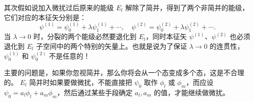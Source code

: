 其次假如说加入微扰过后原来的能级 $E_{l}$ 解除了简并，得到了两个非简并的能级，它们对应的本征矢分别是：
\begin{equation}
	\psi^{(1)}=\psi_{0}^{(1)}+\lambda\psi_{1}^{(1)}+\cdots, \quad \psi^{(2)}=\psi_{0}^{(2)}+\lambda\psi_{1}^{(2)}+\cdots.
\end{equation}
当 $\lambda\to 0$ 时，分裂的两个能级必然要退化到 $E_{l}$，同时本征矢 $\psi^{(1)}$、$\psi^{(2)}$ 也必须退化到 $E_{l}$ 子空间中的两个特别的矢量上。也就是说为了保证 $\lambda\to 0$ 的连贯性，$\psi_{0}^{(1)}$ 和 $\psi_{0}^{(2)}$ 不是任意的！

主要的问题是，如果你忽视简并，那么你将会从一个态变成多个态，这是不合理的。 $E_{l}$ 简并时如果要做微扰，不能直接把 $\psi_{0}$ 取作 $\phi_{l}$ 或 $\phi_{m}$，而应设 $\psi_{0}=a_{l}\phi_{l}+a_{m}\phi_{m}$，然后通过某些手段确定 $a_{l},a_{m}$ 的值，才能继续做微扰。


